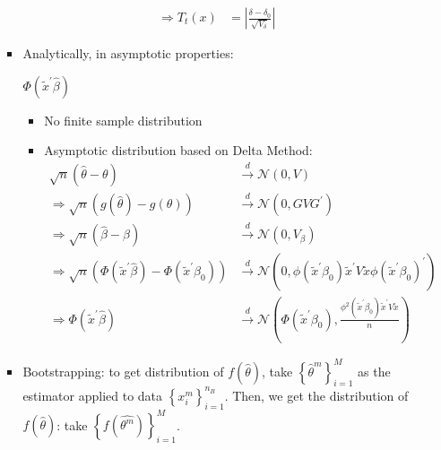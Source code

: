 \begin{enumerate}
\begin{itemize}
\begin{itemize}
\begin{align*}
                    \Rightarrow T_t(x) &= \left\vert \frac{\delta - \delta_0}{\sqrt{V_{\delta}} } \right\vert 
                \end{align*}
            \item Analytically, in asymptotic properties:
                \begin{eg}
                    $\Phi (\tilde{x}^{\prime} \hat{\beta})$
                    \begin{itemize}
                        \item No finite sample distribution
                        \item Asymptotic distribution based on Delta Method:
                        \begin{align*}
                            \sqrt{n}(\hat{\theta} - \theta) &\xrightarrow{d} \mathcal{N}(0, V) \\
                            \Rightarrow \sqrt{n} \left(g(\hat{\theta}) - g(\theta)\right) &\xrightarrow{d} \mathcal{N}(0, G V G^{\prime}) \\
                            \Rightarrow \sqrt{n}(\hat{\beta} - \beta ) &\xrightarrow{d} \mathcal{N}(0, V_{\beta}) \\
                            \Rightarrow \sqrt{n}\left(\Phi(\tilde{x}^{\prime} \hat{\beta}) - \Phi(\tilde{x}^{\prime} \beta_0) \right) &\xrightarrow{d} \mathcal{N}\left(0, \phi(\tilde{x}^{\prime} \beta_0) \tilde{x}^{\prime} V \tilde{x} \phi(\tilde{x}^{\prime} \beta_0)^{\prime} \right) \\
                            \Rightarrow \Phi(\tilde{x}^{\prime} \hat{\beta}) &\xrightarrow{d} \mathcal{N}\left(\Phi(\tilde{x}^{\prime} \beta_0), \frac{\phi^{2}(\tilde{x}^{\prime} \beta_0) \tilde{x}^{\prime} V \tilde{x}}{n}\right)
                        \end{align*}
                    \end{itemize}
                \end{eg}
            \item Bootstrapping: to get distribution of $f(\hat{\theta})$, take $\left\{ \hat{\theta}^m \right\}_{i=1}^{M}$ as the estimator applied to data $\left\{ x_i^{m} \right\}_{i=1}^{n_B}$.
                Then, we get the distribution of $f(\hat{\theta})$: take $\left\{ f(\hat{\theta^m}) \right\}_{i=1}^{M}$.
        \end{itemize}
    \end{itemize}
\end{enumerate}

